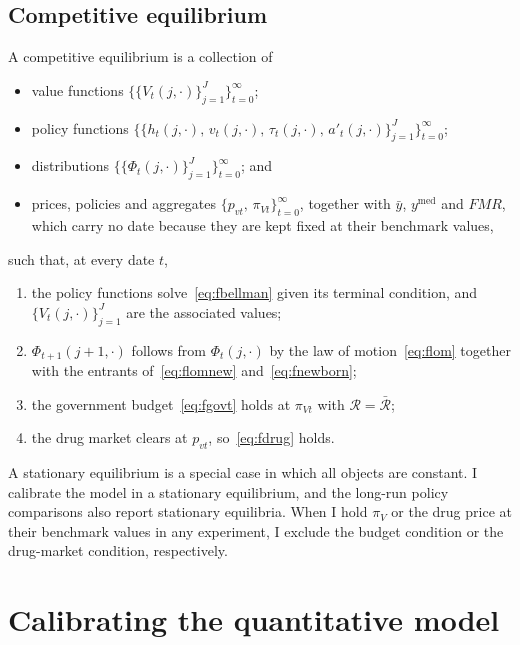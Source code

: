 \documentclass[10pt]{article}
\begin{document}
\subsection{Competitive equilibrium}

A competitive equilibrium is a collection of
\begin{itemize}\setlength{\itemsep}{0em}\setlength{\parskip}{0em}
\item value functions $\big\{\{V_t(j,\cdot)\}_{j=1}^{J}\big\}_{t=0}^{\infty}$;
\item policy functions
$\big\{\{h_t(j,\cdot),\,v_t(j,\cdot),\,\tau_t(j,\cdot),\,a'_t(j,\cdot)\}_{j=1}^{J}\big\}_{t=0}^{\infty}$;
\item distributions $\big\{\{\Phi_t(j,\cdot)\}_{j=1}^{J}\big\}_{t=0}^{\infty}$; and
\item prices, policies and aggregates
$\big\{p_{vt},\,\pi_{Vt}\big\}_{t=0}^{\infty}$, together with $\bar y$, $y^{\text{med}}$ and
$\mathit{FMR}$, which carry no date because they are kept fixed at their benchmark values,
\end{itemize}
such that, at every date $t$,
\begin{enumerate}\setlength{\itemsep}{0.1em}\setlength{\parskip}{0em}
\item the policy functions solve~\eqref{eq:fbellman} given its terminal condition, and
$\{V_t(j,\cdot)\}_{j=1}^{J}$ are the associated values;
\item $\Phi_{t+1}(j{+}1,\cdot)$ follows from $\Phi_t(j,\cdot)$ by the law of
motion~\eqref{eq:flom} together with the entrants of~\eqref{eq:flomnew}
and~\eqref{eq:fnewborn};
\item the government budget~\eqref{eq:fgovt} holds at
$\pi_{Vt}$ with $\mathcal R=\bar{\mathcal R}$;
\item the drug market clears at $p_{vt}$, so~\eqref{eq:fdrug} holds.
\end{enumerate}
  A stationary equilibrium is a special case in which all objects are constant. I calibrate the model in a stationary equilibrium, and the long-run policy comparisons also report stationary equilibria. When I hold $\pi_V$ or the drug price at their benchmark values in any experiment, I exclude the budget condition or the drug-market condition, respectively.

\section{Calibrating the quantitative model}\label{sec:fullcal}
\end{document}
